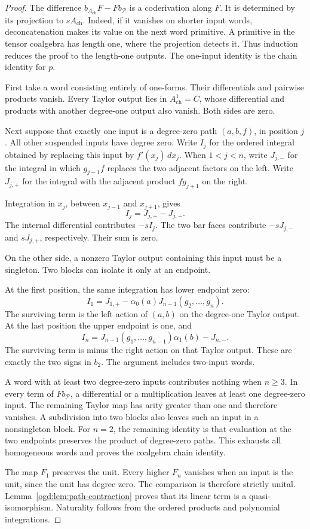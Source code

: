 \begin{proof}
The difference \(b_{A_{\mathrm{ch}}}F-Fb_{\mathcal P}\) is a coderivation
along \(F\).
It is determined by its projection to \(sA_{\mathrm{ch}}\).
Indeed, if it vanishes on shorter input words, deconcatenation makes its
value on the next word primitive.
A primitive in the tensor coalgebra has length one, where the projection
detects it.
Thus induction reduces the proof to the length-one outputs.
The one-input identity is the chain identity for \(p\).

First take a word consisting entirely of one-forms.
Their differentials and pairwise products vanish.
Every Taylor output lies in \(A_{\mathrm{ch}}^1=C\), whose differential
and products with another degree-one output also vanish.
Both sides are zero.

Next suppose that exactly one input is a degree-zero path
\((a,b,f)\), in position \(j\).
All other suspended inputs have degree zero.
Write \(I_j\) for the ordered integral obtained by replacing this input
by \(f'(x_j)\,dx_j\).
When \(1<j<n\), write \(J_{j,-}\) for the integral in which
\(g_{j-1}f\) replaces the two adjacent factors on the left.
Write \(J_{j,+}\) for the integral with the adjacent product \(fg_{j+1}\)
on the right.

Integration in \(x_j\), between \(x_{j-1}\) and \(x_{j+1}\), gives
\[
 I_j=J_{j,+}-J_{j,-}.
\]
The internal differential contributes \(-sI_j\).
The two bar faces contribute \(-sJ_{j,-}\) and \(sJ_{j,+}\), respectively.
Their sum is zero.

On the other side, a nonzero Taylor output containing this input must be
a singleton.
Two blocks can isolate it only at an endpoint.

At the first position, the same integration has lower endpoint zero:
\[
 I_1=J_{1,+}-\alpha_0(a)J_{n-1}(g_2,\ldots,g_n).
\]
The surviving term is the left action of \((a,b)\) on the degree-one
Taylor output.
At the last position the upper endpoint is one, and
\[
 I_n=J_{n-1}(g_1,\ldots,g_{n-1})\alpha_1(b)-J_{n,-}.
\]
The surviving term is minus the right action on that Taylor output.
These are exactly the two signs in \(b_2\).
The argument includes two-input words.

A word with at least two degree-zero inputs contributes nothing when
\(n\geq3\).
In every term of \(F b_{\mathcal P}\), a differential or a multiplication
leaves at least one degree-zero input.
The remaining Taylor map has arity greater than one and therefore
vanishes.
A subdivision into two blocks also leaves such an input in a nonsingleton
block.
For \(n=2\), the remaining identity is that evaluation at the two
endpoints preserves the product of degree-zero paths.
This exhausts all homogeneous words and proves the coalgebra chain
identity.

The map \(F_1\) preserves the unit.
Every higher \(F_n\) vanishes when an input is the unit, since the unit
has degree zero.
The comparison is therefore strictly unital.
Lemma~\ref{ogd:lem:path-contraction} proves that its linear term is a
quasi-isomorphism.
Naturality follows from the ordered products and polynomial integrations.
\end{proof}

